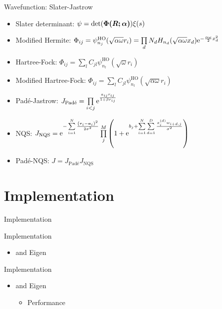 \documentclass[10pt, t, xcolor=dvipsnames]{beamer}
\begin{document}
{{{{{\begin{frame}[fragile]{Wavefunction: Slater-Jastrow}
    \begin{itemize}
        \item Slater determinant: $\psi =
            \det(\blds{\Phi(\blds{R};\blds{\alpha})}) \xi(s)$
        \item Modified Hermite: $\Phi_{ij} =
            \psi^{\text{HO}}_{n_j}(\sqrt{\alpha\omega}r_i) = \prod\limits_d N_d
            H_{n_d}(\sqrt{\alpha \omega}x_d)\me^{-\frac{\alpha\omega}{2}x^2_d}$
        \item Hartree-Fock: $\Phi_{ij} =
            \sum\limits_lC_{jl}\psi^{\text{HO}}_{n_l}\left(\sqrt{\omega}r_i\right)$
        \item Modified Hartree-Fock: $\Phi_{ij} =
            \sum\limits_lC_{jl}\psi^{\text{HO}}_{n_l}\left(\sqrt{\alpha\omega}r_i\right)$
        \item Pad\'e-Jastrow: $J_{\text{Pad\'e}} = \prod\limits_{i<j}
            \me^{\frac{a_{ij} r_{ij}}{1 + \beta r_{ij}}}$
        \item NQS: $J_{\text{NQS}} = \me^{-\suml{i=1}{N} \frac{\left(\bm{r}_i -
            \bm{a}_i\right)^2}{2\sigma^2}}\prod\limits^{M}_j \left(1 + \me^{b_j
            + \suml{i=1}{N}\suml{d=1}{D}
            \frac{x^{(d)}_iw_{i+d,j}}{\sigma^2}}\right)$
        \item Pad\'e-NQS: $J = J_{\text{Pad\'e}}J_{\text{NQS}}$
    \end{itemize}
\end{frame}

\section{Implementation}

\begin{frame}[fragile]{Implementation}
\end{frame}

\begin{frame}[fragile]{Implementation}
    \begin{itemize}
        \item \CC and Eigen
    \end{itemize}
\end{frame}

\begin{frame}[fragile]{Implementation}
    \begin{itemize}
        \item \CC and Eigen
            \begin{itemize}
                \item Performance
            \end{itemize}
    \end{itemize}
\end{frame}

}}}}}
\end{document}
